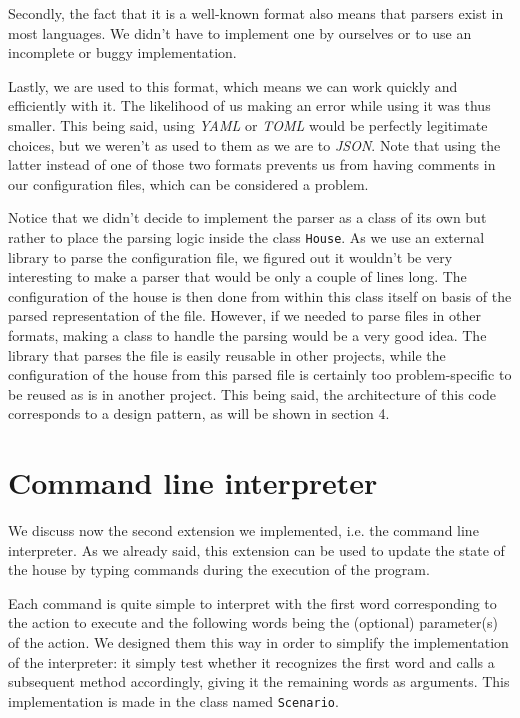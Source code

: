 		Secondly, the fact that it is a well-known format also means that parsers exist in most languages. We didn't have to implement one by ourselves or to use an incomplete or buggy implementation.

		Lastly, we are used to this format, which means we can work quickly and efficiently with it. The likelihood of us making an error while using it was thus smaller. This being said, using \textit{YAML} or \textit{TOML} would be perfectly legitimate choices, but we weren't as used to them as we are to \textit{JSON}. Note that using the latter instead of one of those two formats prevents us from having comments in our configuration files, which can be considered a problem.
		
		Notice that we didn't decide to implement the parser as a class of its own but rather to place the parsing logic inside the class \texttt{House}. As we use an external library to parse the configuration file, we figured out it wouldn't be very interesting to make a parser that would be only a couple of lines long. The configuration of the house is then done from within this class itself on basis of the parsed representation of the file. However, if we needed to parse files in other formats, making a class to handle the parsing would be a very good idea. The library that parses the file is easily reusable in other projects, while the configuration of the house from this parsed file is certainly too problem-specific to be reused as is in another project. This being said, the architecture of this code corresponds to a design pattern, as will be shown in section 4.
	
	\section{Command line interpreter}
		We discuss now the second extension we implemented, i.e. the command line interpreter. As we already said, this extension can be used to update the state of the house by typing commands during the execution of the program.
		
		Each command is quite simple to interpret with the first word corresponding to the action to execute and the following words being the (optional) parameter(s) of the action. We designed them this way in order to simplify the implementation of the interpreter: it simply test whether it recognizes the first word and calls a subsequent method accordingly, giving it the remaining words as arguments. This implementation is made in the class named \texttt{Scenario}.
		
